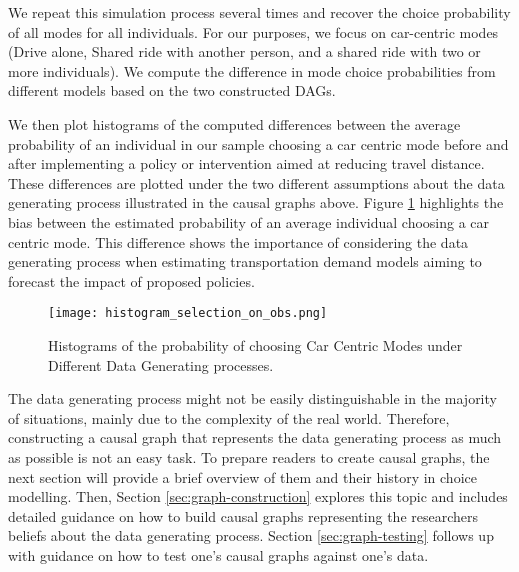 We repeat this simulation process several times and recover the choice probability of all modes for all individuals.
For our purposes, we focus on car-centric modes (Drive alone, Shared ride with another person,
and a shared ride with two or more individuals).
We compute the difference in mode choice probabilities from different models based on the two constructed DAGs.



We then plot histograms of the computed differences between the average probability of an individual
in our sample choosing a car centric mode before and after implementing a policy or intervention
aimed at reducing travel distance.
These differences are plotted under the two different assumptions about the data generating process illustrated in the causal graphs above.
Figure \ref{fig:histogram_probability} highlights the bias between the estimated probability of an average individual choosing a car centric mode.
This difference shows the importance of considering the data generating process when estimating transportation demand models aiming to forecast the impact of proposed policies.

\begin{figure}
   \centering
   \texttt{[image: histogram\_selection\_on\_obs.png]}
   \caption{Histograms of the probability of choosing Car Centric Modes under Different Data Generating processes.}
   \label{fig:histogram_probability}
\end{figure}

The data generating process might not be easily distinguishable in the majority of situations, mainly due to the complexity of the real world.
Therefore, constructing a causal graph that represents the data generating process as much as possible is not an easy task.
To prepare readers to create causal graphs, the next section will provide a brief overview of them and their history in choice modelling.
Then, Section \ref{sec:graph-construction} explores this topic and includes detailed guidance on how to build causal graphs representing the researchers beliefs about the data generating process.
Section \ref{sec:graph-testing} follows up with guidance on how to test one's causal graphs against one's data.
